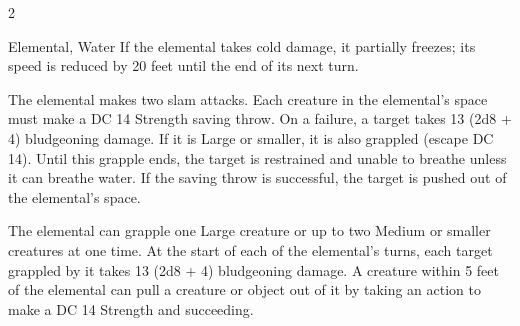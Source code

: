 \begin{multicols}{2}
\begin{DndMonster}{Elemental, Water}
	 If the elemental takes cold damage, it partially freezes; its speed is reduced by 20 feet until the end of its next turn.
	
	 The elemental makes two slam attacks.
	\DndMonsterAttack[
		name=Slam,
		distance=melee,
		type=weapon,
		mod=+7,
		reach=5,
		dmg=\DndDice{2d8 + 4},
		dmg-type=bludgeoning
	]
	Each creature in the elemental's space must make a DC 14 Strength saving throw. On a failure, a target takes 13 (2d8 + 4) bludgeoning damage. If it is Large or smaller, it is also grappled (escape DC 14). Until this grapple ends, the target is restrained and unable to breathe unless it can breathe water. If the saving throw is successful, the target is pushed out of the elemental's space.

	The elemental can grapple one Large creature or up to two Medium or smaller creatures at one time. At the start of each of the elemental's turns, each target grappled by it takes 13 (2d8 + 4) bludgeoning damage. A creature within 5 feet of the elemental can pull a creature or object out of it by taking an action to make a DC 14 Strength and succeeding.
	\end{DndMonster}
	
\end{multicols}